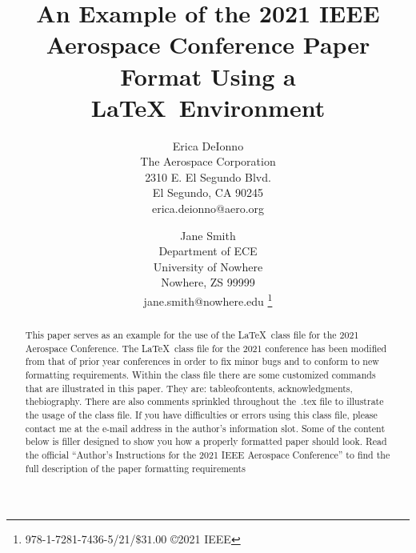 \documentclass[twocolumn,letterpaper]{IEEEAerospaceCLS}  %
\begin{document}
\title{An Example of the 2021 IEEE Aerospace Conference Paper Format Using a \LaTeX~Environment}

\author{%
Erica DeIonno\\ 
The Aerospace Corporation\\
2310 E. El Segundo Blvd.\\
El Segundo, CA 90245\\
erica.deionno@aero.org
\and 
Jane Smith\\
Department of ECE\\
University of Nowhere\\
Nowhere, ZS 99999\\
jane.smith@nowhere.edu
\thanks{\footnotesize 978-1-7281-7436-5/21/$\$31.00$ \copyright2021 IEEE}              %
}



\maketitle

\thispagestyle{plain}
\pagestyle{plain}



\maketitle

\thispagestyle{plain}
\pagestyle{plain}

\begin{abstract}
This paper serves as an example for the use of the \LaTeX~class file for the 2021 Aerospace Conference. The \LaTeX~class file for the 2021 conference has been modified from that of prior year conferences in order to fix minor bugs and to conform to new formatting requirements. Within the class file there are some customized commands that are illustrated in this paper. They are: tableofcontents, acknowledgments, thebiography. There are also comments sprinkled throughout the~.tex file to illustrate the usage of the class file. If you have difficulties or errors using this class file, please contact me at the e-mail address in the author's information slot. Some of the content below is filler designed to show you how a properly formatted paper should look. Read the official ``Author's Instructions for the 2021 IEEE Aerospace Conference'' to find the full description of the paper formatting requirements
\end{abstract} 
\end{document}
